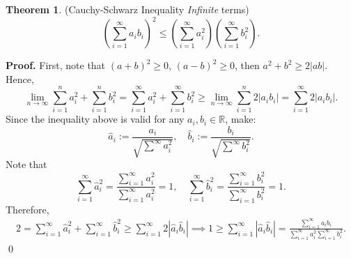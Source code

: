 \documentclass[11pt]{article}
\theoremstyle{definition}
\newenvironment{prf}[1][Proof]{\textbf{#1.} }{\qed}
\newtheorem{theorem}{Theorem}[section]
\begin{document}
\newpage
\begin{theorem}{(Cauchy-Schwarz Inequality \textit{Infinite} terms)}
   \begin{equation}
    \left( 
        \sum^{\infty}_{i=1} a_i b_i
    \right) ^2
    \leq
    \left( 
        \sum^{\infty}_{i=1}a_i^2
    \right)
    \left( 
    \sum^{\infty}_{i=1}b_i^2
    \right).
   \end{equation}
\end{theorem}

\begin{shaded}
\begin{prf}
    First, note that $(a+b)^2 \geq 0$, $(a-b)^2 \geq 0$, then
    $a^2 + b^2 \geq 2 |ab|$. Hence,
    \begin{equation*}
        \lim_{n\to \infty}
        \sum^n_{i=1} a_i ^2 +
        \sum^n_{i=1} b_i ^2
         = 
        \sum^{\infty}_{i=1} a_i ^2  
        +
        \sum^{\infty}_{i=1} b_i ^2
        \geq
        \lim_{n\to \infty}
        \sum^n_{i=1}2|a_i b_i| =
        \sum^{\infty}_{i=1} 2 |a_ib_i|.
    \end{equation*}
    Since the inequality above is valid for any $a_i,b_i \in \mathbb R$,
    make:
    \begin{equation*}
        \hat a_i := \frac{a_i}{\sqrt{\sum^{\infty}a_i^2}} ,\quad
        \hat b_i := \frac{b_i}{\sqrt{\sum^{\infty}b_i^2}}.
    \end{equation*}
    Note that
    \begin{equation*}
    \sum^{\infty}_{i=1} \hat a_i ^2 = 
    \frac{\sum^{\infty}_{i=1} a_i ^2}{\sum^{\infty}_{i=1} a_i ^2} = 1
    , \quad
    \sum^{\infty}_{i=1} \hat b_i ^2 = 
    \frac{\sum^{\infty}_{i=1} b_i ^2}{\sum^{\infty}_{i=1} b_i ^2} = 1.
    \end{equation*}
    Therefore,
    \begin{align*}
        2 =
        \sum^{\infty}_{i=1} \hat a_i ^2  
        +
        \sum^{\infty}_{i=1} \hat b_i ^2
        \geq
        \sum^{\infty}_{i=1} 2 |\hat a_i \hat b_i|
        \implies
        1 \geq 
        \sum^{\infty}_{i=1} |\hat a_i \hat b_i|
        = 
        \frac{\sum^{\infty}_{i=1} a_i b_i}
        {\sum^{\infty}_{i=1}a_i^2
        \sum^{\infty}_{i=1}b_i^2}.
    \end{align*}
\end{prf}
\end{shaded}
\end{document}
